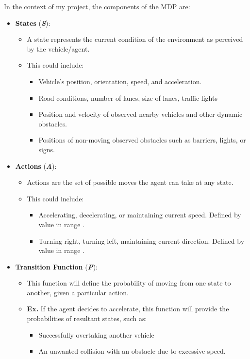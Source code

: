 \documentclass[10pt,twocolumn]{article}
\begin{document}
In the context of my project, the components of the MDP are:
\begin{itemize}
    \item \textbf{States }(\textbf{\textit{S}}):
    \begin{itemize}
        \item A state represents the current condition of the environment as perceived by the vehicle/agent.
        \item This could include:
        \begin{itemize}
            \item Vehicle's position, orientation, speed, and acceleration.
            \item Road conditions, number of lanes, size of lanes, traffic lights
            \item Position and velocity of observed nearby vehicles and other dynamic obstacles.
            \item Positions of non-moving observed obstacles such as barriers, lights, or signs.
        \end{itemize}
    \end{itemize}
    \item \textbf{Actions }(\textbf{\textit{A}}):
    \begin{itemize}
        \item Actions are the set of possible moves the agent can take at any state. 
        \item This could include:
        \begin{itemize}
            \item Accelerating, decelerating, or maintaining current speed. Defined by value in range \newline[-1,1].
            \item Turning right, turning left, maintaining current direction. Defined by value in range \newline[-1,1].
        \end{itemize}
    \end{itemize}
    \item \textbf{Transition Function } (\textbf{\textit{P}}):
    \begin{itemize}
        \item This function will define the probability of moving from one state to another, given a particular action.
        \item \textbf{Ex.} If the agent decides to accelerate, this function will provide the probabilities of resultant states, such as:
        \begin{itemize}
            \item Successfully overtaking another vehicle
            \item An unwanted collision with an obstacle due to excessive speed.
        \end{itemize}
    \end{itemize}
\end{itemize}
\end{document}
